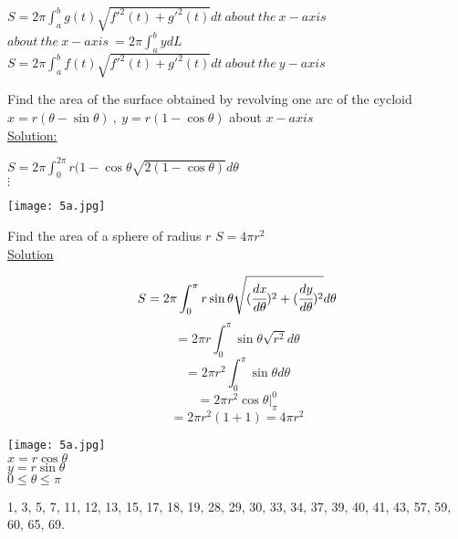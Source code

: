 \begin{center}
    $S=2\pi\int_a^b g(t)\sqrt{f'^2(t)+g'^2(t)}dt~about~the~x-axis$\\
$about~the~x-axis~=2\pi\int_a^b ydL$\\
$S=2\pi\int_a^b f(t)\sqrt{f'^2(t)+g'^2(t)}dt~about~the~y-axis$
\end{center}
\begin{example}
Find the area of the surface obtained by revolving one arc of the cycloid $x=r(\theta-\sin\theta)~,~y=r(1-\cos\theta)$ about $x-axis$\\
\underline{\color{smalt(darkpowderblue)}Solution:}\\
\begin{minipage}{0.6\textwidth}
\begin{center}
$S=2\pi\int_0^{2\pi}r(1-\cos\theta\sqrt{2(1-\cos\theta)}d\theta$\\
$\vdots$    
\end{center}
\end{minipage}
\begin{minipage}{0.6\textwidth}
\texttt{[image: 5a.jpg]}
\end{minipage}
\end{example}

\begin{example}
Find the area of a sphere of radius $r$ $\boxed{S=4\pi r^2}$\\
\underline{\color{smalt(darkpowderblue)}Solution} \\
\begin{minipage}{0.6\textwidth}
$$S=2\pi\int_0^\pi r\sin\theta\sqrt{(\cfrac{dx}{d\theta})^2+(\cfrac{dy}{d\theta})^2}d\theta$$
$$=2\pi r\int_0^\pi\sin\theta\sqrt{r^2}d\theta$$
$$=2\pi r^2\int_0^\pi\sin\theta d\theta$$
$$=2\pi r^2\cos\theta|_\pi^0$$
$$=2\pi r^2(1+1)=4\pi r^2$$
\end{minipage}
\begin{minipage}{0.6\textwidth}
\texttt{[image: 5a.jpg]}\\
$x=r\cos\theta$\\
$y=r\sin\theta$\\
$0\leq\theta\leq\pi$
\end{minipage}
\end{example}
\noindent{\color{smalt(darkpowderblue)}\rule{\linewidth}{.2mm}}
\begin{problem}
 1, 3, 5, 7, 11, 12, 13, 15, 17, 18, 19, 28, 29, 30, 33, 34, 37, 39, 40, 41, 43, 57, 59, 60, 65, 69.
\end{problem}
